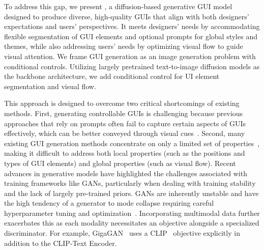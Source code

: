 To address this gap, we present \systemname, a diffusion-based generative GUI model designed to produce diverse, high-quality GUIs that align with both designers' expectations and users' perspectives. 
It meets designers' needs by accommodating flexible segmentation of GUI elements and optional prompts for global styles and themes, while also addressing users' needs by optimizing visual flow to guide visual attention.
We frame GUI generation as an image generation problem with conditional controls. 
Utilizing largely pretrained text-to-image diffusion models as the backbone architecture, we add conditional control for UI element segmentation and visual flow. 

This approach is designed to overcome two critical shortcomings of existing methods. 
First, generating controllable GUIs is challenging because previous approaches that rely on prompts often fail to capture certain aspects of GUIs effectively, which can be better conveyed through visual cues~\cite{}.
Second, many existing GUI generation methods concentrate on only a limited set of properties~\cite{}, making it difficult to address both local properties (such as the positions and types of GUI elements) and global properties (such as visual flow).
Recent advances in generative models have highlighted the challenges associated with training frameworks like GANs, particularly when dealing with training stability and the lack of largely pre-trained priors. 
GANs are inherently unstable and have the high tendency of a generator to mode collapse requiring careful hyperparameter tuning and optimization~\cite{GAN_hard01, GAN_hard02, GAN_hard03, diffusion_beat_gans}. 
Incorporating multimodal data further exacerbates this as each modality necessitates an objective alongside a specialized discriminator. For example, GigaGAN~\cite{giga_gan} uses a CLIP~\cite{clip} objective explicitly in addition to the CLIP-Text Encoder. 

